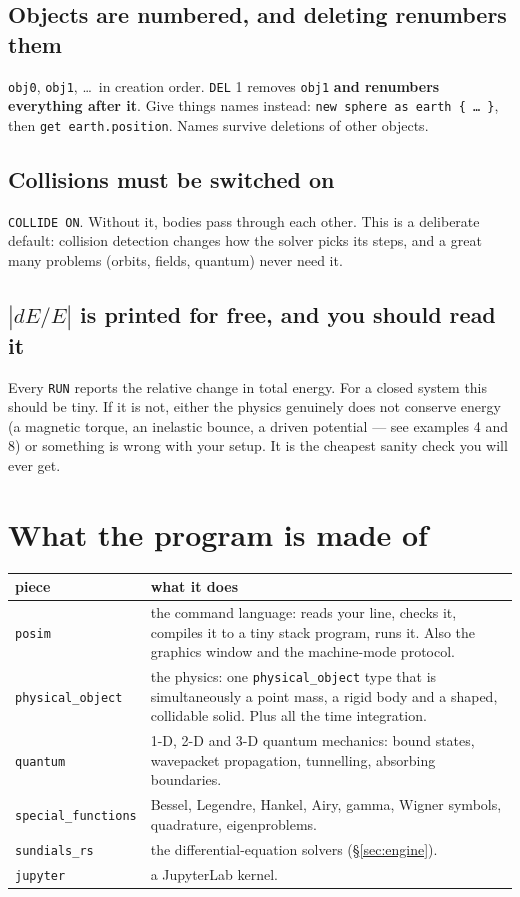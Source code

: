 \documentclass[11pt]{article}
\newcommand{\kw}[1]{\texttt{\uppercase{#1}}}
\newcommand{\code}[1]{\texttt{#1}}
\begin{document}
\subsection{Objects are numbered, and deleting renumbers them}

\code{obj0}, \code{obj1}, \dots\ in creation order. \kw{del} 1 removes
\code{obj1} \textbf{and renumbers everything after it}. Give things
names instead: \code{new sphere as earth \{ \dots\ \}}, then
\code{get earth.position}. Names survive deletions of other objects.

\subsection{Collisions must be switched on}

\kw{collide on}. Without it, bodies pass through each other. This is a
deliberate default: collision detection changes how the solver picks its
steps, and a great many problems (orbits, fields, quantum) never need
it.

\subsection{$|dE/E|$ is printed for free, and you should read it}

Every \kw{run} reports the relative change in total energy. For a closed
system this should be tiny. If it is not, either the physics genuinely
does not conserve energy (a magnetic torque, an inelastic bounce, a
driven potential --- see examples 4 and 8) or something is wrong with
your setup. It is the cheapest sanity check you will ever get.

\section{What the program is made of}

\begin{center}
\begin{tabular}{p{3.2cm}p{11.4cm}}
\textbf{piece} & \textbf{what it does}\\\hline
\code{posim} & the command language: reads your line, checks it,
compiles it to a tiny stack program, runs it. Also the graphics window
and the machine-mode protocol.\\
\code{physical\_object} & the physics: one \code{physical\_object} type
that is simultaneously a point mass, a rigid body and a shaped,
collidable solid. Plus all the time integration.\\
\code{quantum} & 1-D, 2-D and 3-D quantum mechanics: bound states,
wavepacket propagation, tunnelling, absorbing boundaries.\\
\code{special\_functions} & Bessel, Legendre, Hankel, Airy, gamma,
Wigner symbols, quadrature, eigenproblems.\\
\code{sundials\_rs} & the differential-equation solvers (\S\ref{sec:engine}).\\
\code{jupyter} & a JupyterLab kernel.\\
\end{tabular}
\end{center}
\end{document}
